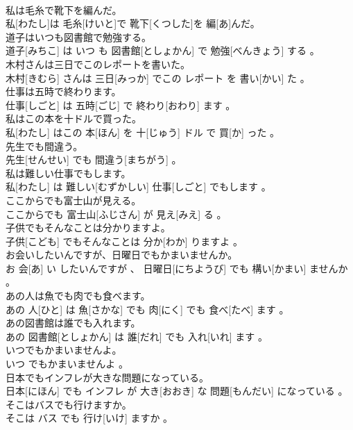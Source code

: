 \documentclass[8pt]{extreport}
\begin{document}
\begin{CJK}{UTF8}{min}
\\	私は毛糸で靴下を編んだ。	
\\	私[わたし]は 毛糸[けいと]で 靴下[くつした]を 編[あ]んだ。
\\	道子はいつも図書館で勉強する。	
\\	道子[みちこ] は いつ も 図書館[としょかん] で 勉強[べんきょう] する 。
\\	木村さんは三日でこのレポートを書いた。	
\\	木村[きむら] さんは 三日[みっか] でこの レポート を 書い[かい] た 。
\\	仕事は五時で終わります。	
\\	仕事[しごと] は 五時[ごじ] で 終わり[おわり] ます 。
\\	私はこの本を十ドルで買った。	
\\	私[わたし] はこの 本[ほん] を 十[じゅう] ドル で 買[か] った 。
\\	先生でも間違う。	
\\	先生[せんせい] でも 間違う[まちがう] 。
\\	私は難しい仕事でもします。	
\\	私[わたし] は 難しい[むずかしい] 仕事[しごと] でもします 。
\\	ここからでも富士山が見える。	
\\	ここからでも 富士山[ふじさん] が 見え[みえ] る 。
\\	子供でもそんなことは分かりますよ。	
\\	子供[こども] でもそんなことは 分か[わか] りますよ 。
\\	お会いしたいんですが、日曜日でもかまいませんか。	
\\	お 会[あ] い したいんですが 、 日曜日[にちようび] でも 構い[かまい] ませんか 。
\\	あの人は魚でも肉でも食べます。	
\\	あの 人[ひと] は 魚[さかな] でも 肉[にく] でも 食べ[たべ] ます 。
\\	あの図書館は誰でも入れます。	
\\	あの 図書館[としょかん] は 誰[だれ] でも 入れ[いれ] ます 。
\\	いつでもかまいませんよ。	
\\	いつ でもかまいませんよ 。
\\	日本でもインフレが大きな問題になっている。	
\\	日本[にほん] でも インフレ が 大き[おおき] な 問題[もんだい] になっている 。
\\	そこはバスでも行けますか。	
\\	そこは バス でも 行け[いけ] ますか 。

\end{CJK}
\end{document}
